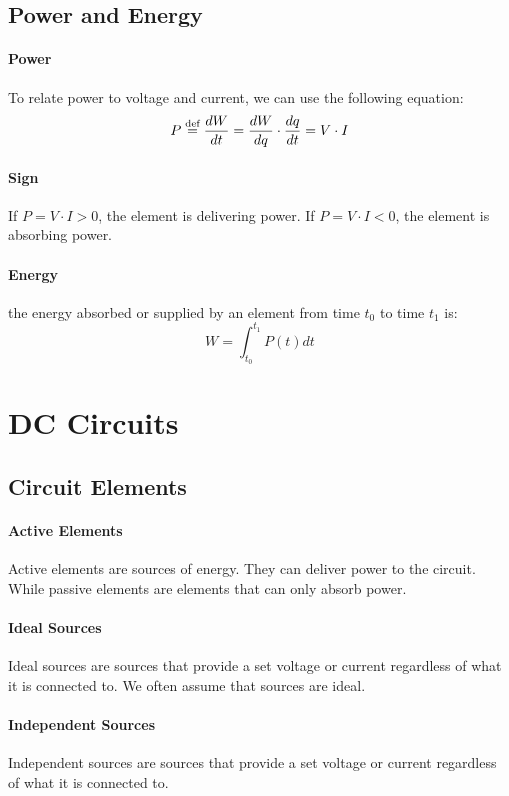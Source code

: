 \documentclass[11pt]{article}
\begin{document}
\subsection{Power and Energy}
\paragraph{Power} To relate power to  voltage and current, we can use the following equation:
\begin{equation}
    P \stackrel{\text{def}}{=} \frac{dW}{dt} = \frac{dW}{dq} \cdot \frac{dq}{dt} = V \cdot I
\end{equation}
\paragraph{Sign} If $P = V \cdot I > 0$, the element is delivering power. If $P = V \cdot I < 0$, the element is absorbing power.
\paragraph{Energy}  the energy absorbed or supplied by an element
from time $t_0$ to time $t_1$ is:
\begin{equation}
    W = \int_{t_0}^{t_1} P(t) dt
\end{equation}
\section{DC Circuits}
\subsection{Circuit Elements}
\paragraph{Active Elements} Active elements are sources of energy. They can deliver power to the circuit. While passive elements are elements that can only absorb power.
\paragraph{Ideal Sources} Ideal sources are sources that provide a set voltage or current regardless of what it is connected to. We often assume that sources are ideal.
\paragraph{Independent Sources} Independent sources are sources that provide a set voltage or current regardless of what it is connected to.
\end{document}
